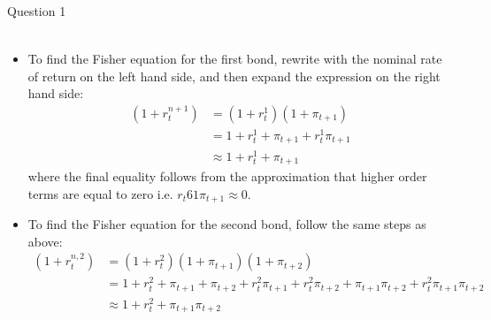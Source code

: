 \documentclass[a4paper]{article}
\begin{document}
\begin{questionbox}{Question 1}
\begin{enumerate}[(a)]
\begin{explanationbox}
\begin{itemize}
\begin{align*}
					\end{align*}
				\end{itemize}
			\end{explanationbox}
			\begin{explanationbox}
				\begin{itemize}
					\item To find the Fisher equation for the first bond, rewrite with the nominal rate of return on the left hand side, and then expand the expression on the right hand side:
					\begin{align*}
						(1+r_t^{n+1}) &= (1+r_t^1)(1+\pi_{t+1})\\
						&=  1 + r_t^1 + \pi_{t+1} + r_t^1 \pi_{t+1}\\
						&\approx 1 + r_t^1 + \pi_{t+1}
					\end{align*}
					where the final equality follows from the approximation that higher order terms are equal to zero i.e. \( r_t61 \pi_{t+1} \approx 0 \).
					\item To find the Fisher equation for the second bond, follow the same steps as above:
					\begin{align*}
						(1+r_t^{n,2}) &= (1+r_t^2)(1+\pi_{t+1})(1+\pi_{t+2})\\
						&= 1 + r_t^2 + \pi_{t+1} + \pi_{t+2} + r_t^2 \pi_{t+1} + r_t^2 \pi_{t+2} + \pi_{t+1}\pi_{t+2} + r_t^2\pi_{t+1}\pi_{t+2}\\
						&\approx 1 + r_t^2 + \pi_{t+1} \pi_{t+2}
					\end{align*}
				\end{itemize}
			\end{explanationbox}
		\end{enumerate}
	\end{questionbox}
\end{document}
